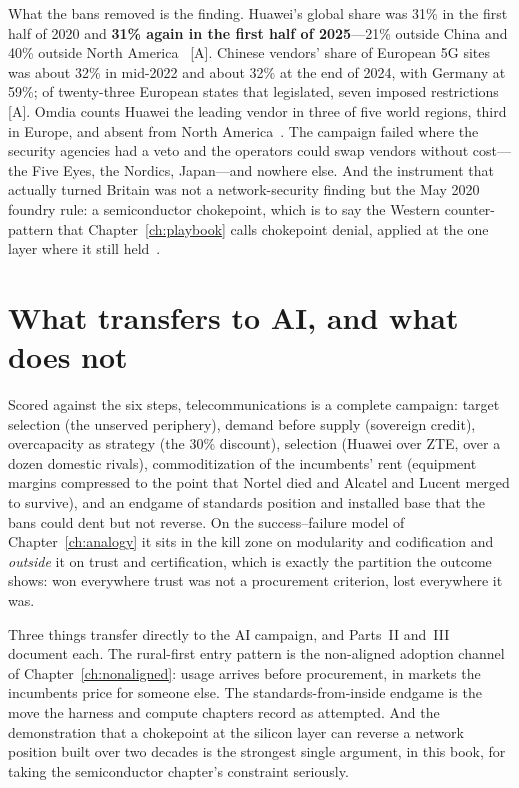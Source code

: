 What the bans removed is the finding. Huawei's global share was 31\% in the first half of 2020 and \textbf{31\% again in the first half of 2025}---21\% outside China and 40\% outside North America~\cite{delloro-huawei} [A]. Chinese vendors' share of European 5G sites was about 32\% in mid-2022 and about 32\% at the end of 2024, with Germany at 59\%; of twenty-three European states that legislated, seven imposed restrictions~\cite{huawei-bans} [A]. Omdia counts Huawei the leading vendor in three of five world regions, third in Europe, and absent from North America~\cite{delloro-huawei}. The campaign failed where the security agencies had a veto and the operators could swap vendors without cost---the Five Eyes, the Nordics, Japan---and nowhere else. And the instrument that actually turned Britain was not a network-security finding but the May 2020 foundry rule: a semiconductor chokepoint, which is to say the Western counter-pattern that Chapter~\ref{ch:playbook} calls chokepoint denial, applied at the one layer where it still held~\cite{huawei-bans}.

\section{What transfers to AI, and what does not}

Scored against the six steps, telecommunications is a complete campaign: target selection (the unserved periphery), demand before supply (sovereign credit), overcapacity as strategy (the 30\% discount), selection (Huawei over ZTE, over a dozen domestic rivals), commoditization of the incumbents' rent (equipment margins compressed to the point that Nortel died and Alcatel and Lucent merged to survive), and an endgame of standards position and installed base that the bans could dent but not reverse. On the success--failure model of Chapter~\ref{ch:analogy} it sits in the kill zone on modularity and codification and \emph{outside} it on trust and certification, which is exactly the partition the outcome shows: won everywhere trust was not a procurement criterion, lost everywhere it was.

Three things transfer directly to the AI campaign, and Parts~II and~III document each. The rural-first entry pattern is the non-aligned adoption channel of Chapter~\ref{ch:nonaligned}: usage arrives before procurement, in markets the incumbents price for someone else. The standards-from-inside endgame is the move the harness and compute chapters record as attempted. And the demonstration that a chokepoint at the silicon layer can reverse a network position built over two decades is the strongest single argument, in this book, for taking the semiconductor chapter's constraint seriously.


